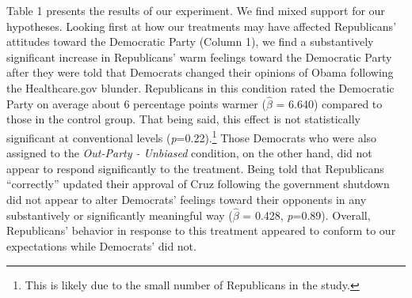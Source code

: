 \documentclass[12pt, letterpaper]{article}
\begin{document}
{Table 1 presents the results of our experiment. We find mixed support for our hypotheses. Looking first at how our treatments may have affected Republicans' attitudes toward the Democratic Party (Column 1), we find a substantively significant increase in Republicans' warm feelings toward the Democratic Party after they were told that Democrats changed their opinions of Obama following the Healthcare.gov blunder. Republicans in this condition rated the Democratic Party on average about 6 percentage points warmer ($\hat{\beta}$ = 6.640) compared to those in the control group. That being said, this effect is not statistically significant at conventional levels (\textit{p}=0.22).\footnote{This is likely due to the small number of Republicans in the study.} Those Democrats who were also assigned to the \textit{Out-Party - Unbiased} condition, on the other hand, did not appear to respond significantly to the treatment. Being told that Republicans  ``correctly'' updated their approval of Cruz following the government shutdown did not appear to alter Democrats' feelings toward their opponents in any substantively or significantly meaningful way ($\hat{\beta}$ = 0.428, \textit{p}=0.89). Overall, Republicans' behavior in response to this treatment appeared to conform to our expectations while Democrats' did not.

}
\end{document}
